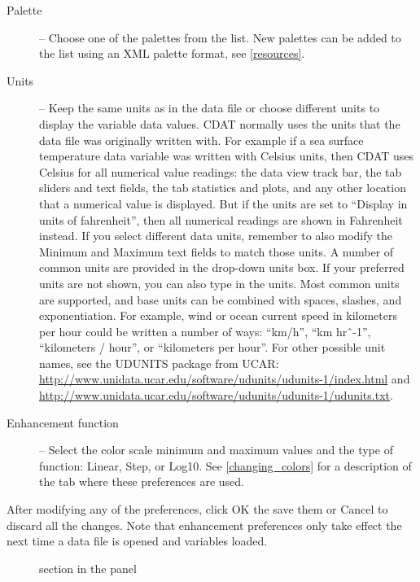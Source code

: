 \begin{description}

\item[Palette] -- Choose one of the palettes from the list.  New
palettes can be added to the list using an XML palette format,
see \autoref{resources}.

\item[Units] -- Keep the same units as in the data file or choose
different units to display the variable data values.  CDAT
normally uses the units that the data file was originally written
with.  For example if a sea surface temperature data variable was
written with Celsius units, then CDAT uses Celsius for all
numerical value readings: the data view track bar, the
 tab sliders and text
fields, the  tab statistics
and plots, and any other location that a numerical value is
displayed.  But if the units are set to ``Display in units of
fahrenheit'', then all numerical readings are shown in Fahrenheit
instead.  If you select different data units, remember to also
modify the {\gui Minimum} and {\gui Maximum} text fields to match
those units.  A number of common units are provided in the
drop-down units box. If your preferred units are not shown, you
can also type in the units. Most common units are supported, and
base units can be combined with spaces, slashes, and
exponentiation. For example, wind or ocean current speed in
kilometers per hour could be written a number of ways: ``km/h'',
``km hr\^{~}-1'', ``kilometers / hour'', or ``kilometers per
hour''.  For other possible unit names, see the UDUNITS package
from UCAR:
\url{http://www.unidata.ucar.edu/software/udunits/udunits-1/index.html}
and
\url{http://www.unidata.ucar.edu/software/udunits/udunits-1/udunits.txt}.

\item[Enhancement function] -- Select the color scale minimum and
maximum values and the type of function: {\gui Linear},
{\gui Step}, or {\gui Log10}. See \autoref{changing_colors} for a
description of the  tab
where these preferences are used.

\end{description}
After modifying any of the preferences, click {\gui OK} the save
them or {\gui Cancel} to discard all the changes.  Note that
enhancement preferences only take effect the next time a data
file is opened and variables loaded.

\begin{figure}
  \begin{center}
    \caption[Enhancement section in the Preferences panel]{
        section in the
        panel
    }
    \label{enhancement_prefs}
  \end{center}
\end{figure}

